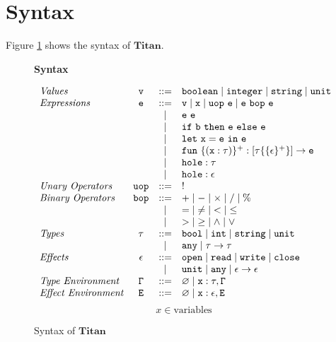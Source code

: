 \documentclass[12pt, a4paper, titlepage]{report}
\begin{document}
  \section{Syntax}
    Figure \ref{fig:syntax} shows the syntax of $\mathbf{Titan}$.
    \begin{figure}[htbp]
      \centering
      \begin{flushleft}
        \textbf{Syntax}
      \end{flushleft}
      \[
      \begin{array}{lccl}
        \emph{Values} &
          \mathtt{v} & ::= & \mathtt{boolean \mid integer \mid string \mid unit}\\
        \emph{Expressions} &
          \mathtt{e} & ::= & \mathtt{v} \mid \mathtt{x} \mid \mathtt{uop\ e \mid e\ bop\ e} \\
          & & \mid & \mathtt{e\ e} \\
          & & \mid & \mathtt{if}\ \mathtt{b}\ \mathtt{then}\ \mathtt{e}\ \mathtt{else}\ \mathtt{e} \\
          & & \mid & \mathtt{let}\ \mathtt{x = e}\ \mathtt{in}\ \mathtt{e} \\
          & & \mid & \mathtt{fun}\ \mathtt{\{(x : \tau)\}^{+} : [\tau \{\{\epsilon\}^{+}\}] \to e} \\
          & & \mid & \mathtt{hole : \tau} \\
          & & \mid & \mathtt{hole : \epsilon} \\
        \emph{Unary Operators} &
          \mathtt{uop} & ::= & ! \\
        \emph{Binary Operators} &
          \mathtt{bop} & ::= & \mathtt{+} \mid \mathtt{-} \mid \mathtt{\times} \mid \mathtt{/} \mid \mathtt{\%} \\
          & & \mid & \mathtt{=} \mid \mathtt{\neq} \mid \mathtt{<} \mid \mathtt{\leq} \\
          & & \mid & \mathtt{>} \mid \mathtt{\geq} \mid \mathtt{\land} \mid \mathtt{\lor} \\
        \emph{Types} &
          \mathtt{\tau} & ::= & \mathtt{bool \mid int \mid string \mid unit} \\
          & & \mid & \mathtt{any \mid \tau \to \tau} \\
        \emph{Effects} &
          \mathtt{\epsilon} & ::= & \mathtt{open \mid read \mid write \mid close} \\
          & & \mid & \mathtt{unit \mid any \mid \epsilon \to \epsilon} \\
        \emph{Type Environment} &
          \mathtt{\Gamma} & ::= & \mathtt{\varnothing \mid x : \tau, \Gamma} \\
        \emph{Effect Environment} &
          \mathtt{E} & ::= & \mathtt{\varnothing \mid x : \epsilon, E} \\
      \end{array}
      \]
      \[
        x \in \textrm{variables}
      \]
      \caption{Syntax of $\mathbf{Titan}$}
      \label{fig:syntax}
    \end{figure}
\end{document}
